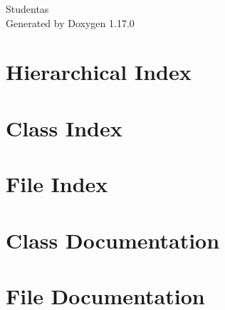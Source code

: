 \documentclass[twoside]{book}
\newcommand{\+}{\discretionary{\mbox{\scriptsize$\hookleftarrow$}}{}{}}
\newcommand{\clearemptydoublepage}{%
    \newpage{\pagestyle{empty}\cleardoublepage}%
  }
\begin{document}
  \raggedbottom
    \hypersetup{pageanchor=false,
                bookmarksnumbered=true,
                pdfencoding=unicode
               }
  \begin{titlepage}
  \vspace*{7cm}
  \begin{center}%
  {\Large Studentas}\\
  \vspace*{1cm}
  {\large Generated by Doxygen 1.17.0}\\
  \end{center}
  \end{titlepage}
  \clearemptydoublepage
  \tableofcontents
  \clearemptydoublepage
  \hypersetup{pageanchor=true}
\chapter{Hierarchical Index}

\chapter{Class Index}

\chapter{File Index}

\chapter{Class Documentation}





\chapter{File Documentation}











  \backmatter
  \newpage
  \clearemptydoublepage
  \printindex
\end{document}
